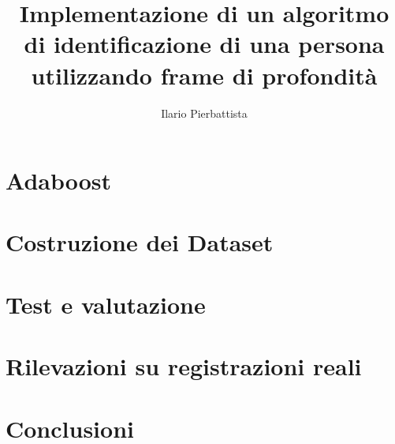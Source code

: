 \documentclass[a4paper,11pt,oneside]{article}
\begin{document}
	\frontespizio
	\tableofcontents
	\newpage

	\title{Implementazione di un algoritmo di identificazione di una persona utilizzando frame di profondità}
	\author{Ilario Pierbattista}

	\linenumbers


	
	\newpage

	
	\newpage

	\section{Adaboost}
	\label{sec:Adaboost}

	\section{Costruzione dei Dataset}
	\label{sec:Costruzione dei Dataset}

	\section{Test e valutazione}
	\label{sec:Test e valutazione}

	\section{Rilevazioni su registrazioni reali}
	\label{sec:Rilevazioni su registrazioni reali}

	\section{Conclusioni}
	\label{sec:Conclusioni}

	
	{}
\end{document}

